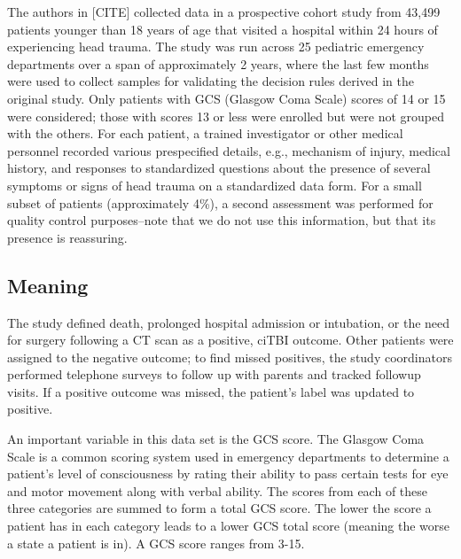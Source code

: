 \documentclass[11pt]{amsart}
\begin{document}
The authors in [CITE] collected data in a prospective cohort study from 43,499 patients younger than 18 years of age that visited a hospital within 24 hours of experiencing head trauma. The study was run across 25 pediatric emergency departments over a span of approximately 2 years, where the last few months were used to collect samples for validating the decision rules derived in the original study. Only patients with GCS (Glasgow Coma Scale) scores of 14 or 15 were considered; those with scores 13 or less were enrolled but were not grouped with the others. For each patient, a trained investigator or other medical personnel recorded various prespecified details, e.g., mechanism of injury, medical history, and responses to standardized questions about the presence of several symptoms or signs of head trauma on a standardized data form. For a small subset of patients (approximately 4\%), a second assessment was performed for quality control purposes--note that we do not use this information, but that its presence is reassuring. 

\subsection{Meaning}


The study defined death, prolonged hospital admission or intubation, or the need for surgery following a CT scan as a positive, ciTBI outcome. Other patients were assigned to the negative outcome; to find missed positives, the study coordinators performed telephone surveys to follow up with parents and tracked followup visits. If a positive outcome was missed, the patient's label was updated to positive. 

An important variable in this data set is the GCS score. The Glasgow Coma Scale is a common scoring system used in emergency departments to determine a patient's level of consciousness by rating their ability to pass certain tests for eye and motor movement along with verbal ability. The scores from each of these three categories are summed to form a total GCS score. The lower the score a patient has in each category leads to a lower GCS total score (meaning the worse a state a patient is in). A GCS score ranges from 3-15.
\end{document}
